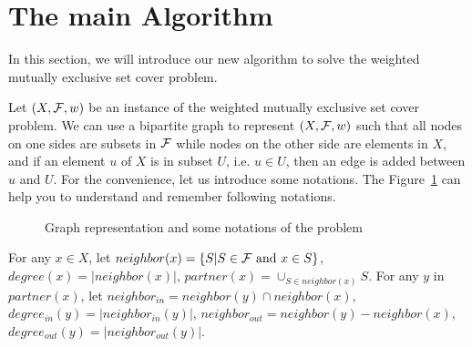 \documentclass[11pt]{article}
\begin{document}
\section{The main Algorithm}

In this section, we will introduce our new algorithm to solve the
{\sc weighted mutually exclusive set cover} problem.


 Let
$(X,{\cal F},w)$ be an instance of the {\sc weighted mutually
exclusive set cover} problem. We can use a bipartite graph to
represent $(X,{\cal F},w)$ such that all nodes on one sides are
subsets in ${\cal F}$ while nodes on the other side are elements
in $X$, and if an element $u$ of $X$ is in subset $U$, i.e. $u \in
U$, then an edge is added between $u$ and $U$. For the
convenience, let us introduce some notations. The
Figure~\ref{fig_1} can help you to understand and remember
following notations.

\begin{figure}[ht]
\centering {}
\caption{Graph representation and some notations of the problem}
\label{fig_1}
\end{figure}

For any $x \in X$, let $neighbor(x) = \{S| S \in {\cal F} \text{
and } x \in S\}$, $degree(x)=|neighbor(x)|$, $partner(x) = \cup_{S
\in neighbor(x)}S$. For any $y$ in $partner(x)$, let
$neighbor_{in} = neighbor(y) \cap neighbor(x)$, $degree_{in}(y) =
|neighbor_{in}(y)|$, $neighbor_{out} = neighbor(y)-neighbor(x)$,
$degree_{out}(y) = |neighbor_{out}(y)|$.
\end{document}
